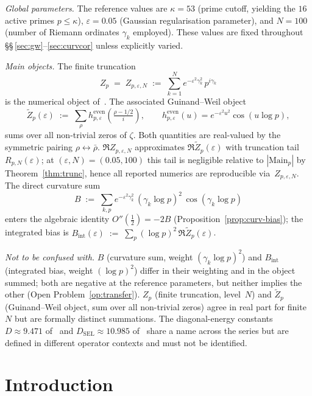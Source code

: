 \documentclass[11pt]{article}
\newcommand{\Zt}{\widetilde{Z}}
\newcommand{\DSEL}{D_{\mathrm{SEL}}}
\begin{document}
\medskip
\emph{Global parameters.}
The reference values are $\kappa=53$ (prime cutoff, yielding the
$16$ active primes $p\le\kappa$), $\varepsilon=0.05$ (Gaussian
regularisation parameter), and $N=100$ (number of Riemann ordinates
$\gamma_k$ employed).
These values are fixed throughout
\S\S\,\ref{sec:gw}--\ref{sec:curvcor} unless explicitly varied.

\medskip
\emph{Main objects.}
The finite truncation
\[
Z_p \;=\; Z_{p,\varepsilon,N} \;:=\;
\sum_{k=1}^{N} e^{-\varepsilon^2\gamma_k^2}\,p^{i\gamma_k}
\]
is the numerical object of~\cite{Paper4,Paper5}.
The associated Guinand--Weil object
\[
\Zt_p(\varepsilon) \;:=\; \sum_{\rho}
h^{\mathrm{even}}_{p,\varepsilon}\!\left(\tfrac{\rho-1/2}{i}\right),
\qquad
h^{\mathrm{even}}_{p,\varepsilon}(u)=e^{-\varepsilon^2 u^2}\cos(u\log p),
\]
sums over all non-trivial zeros of $\zeta$.
Both quantities are real-valued by the symmetric pairing
$\rho\leftrightarrow\bar\rho$.
$\Re Z_{p,\varepsilon,N}$ approximates $\Re\Zt_p(\varepsilon)$ with
truncation tail $R_{p,N}(\varepsilon)$; at
$(\varepsilon,N)=(0.05,100)$ this tail is negligible relative to
$|\mathrm{Main}_p|$ by Theorem~\ref{thm:trunc}, hence all reported
numerics are reproducible via~$Z_{p,\varepsilon,N}$.
The direct curvature sum
\[
B \;:=\; \sum_{k,p} e^{-\varepsilon^2\gamma_k^2}\,
(\gamma_k\log p)^2\,\cos(\gamma_k\log p)
\]
enters the algebraic identity $O''(\tfrac12)=-2B$
(Proposition~\ref{prop:curv-bias}); the integrated bias is
$B_{\mathrm{int}}(\varepsilon)\;:=\;\sum_p (\log p)^2\,\Re\Zt_p(\varepsilon)$.

\medskip
\emph{Not to be confused with.}
$B$ (curvature sum, weight $(\gamma_k\log p)^2$) and $B_{\mathrm{int}}$
(integrated bias, weight $(\log p)^2$) differ in their weighting and
in the object summed; both are negative at the reference parameters,
but neither implies the other (Open Problem~\ref{op:transfer}).
$Z_p$ (finite truncation, level~$N$) and $\Zt_p$ (Guinand--Weil object,
sum over all non-trivial zeros) agree in real part for finite $N$ but
are formally distinct summations.
The diagonal-energy constants $D\approx 9.471$ of~\cite{Paper2} and
$\DSEL\approx 10.985$ of~\cite{Paper5} share a name across the series
but are defined in different operator contexts and must not be
identified.

\newpage

\section{Introduction}
\label{sec:intro}
\end{document}

